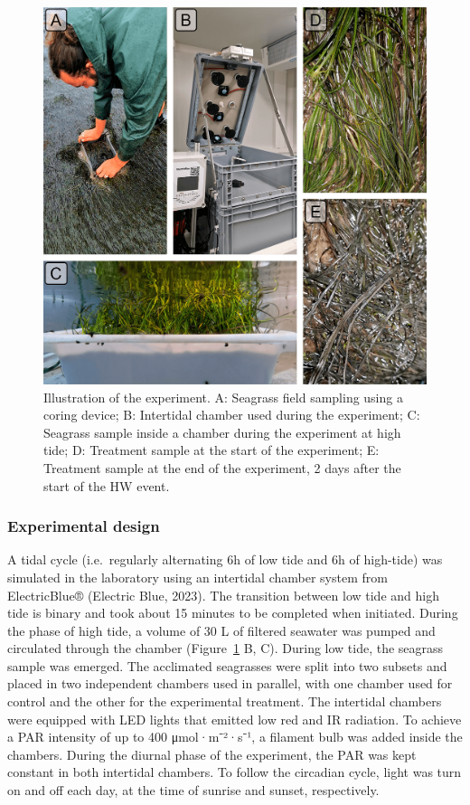 \documentclass[
  letterpaper,
  11pt,
  english,
  singlespacing,
  headsepline]{MastersDoctoralThesis}
\begin{document}
\begin{spacing}{1.5}
\begin{figure}
{\includegraphics[width=0.95\linewidth,height=\textheight,keepaspectratio]{Chapter5/Figs/Experimental_design.png}

}

\caption{\label{fig-design_h}Illustration of the experiment. A: Seagrass
field sampling using a coring device; B: Intertidal chamber used during
the experiment; C: Seagrass sample inside a chamber during the
experiment at high tide; D: Treatment sample at the start of the
experiment; E: Treatment sample at the end of the experiment, 2 days
after the start of the HW event.}

\end{figure}%

\subsubsection{Experimental design}\label{experimental-design}

A tidal cycle (i.e.~regularly alternating 6h of low tide and 6h of
high-tide) was simulated in the laboratory using an intertidal chamber
system from ElectricBlue® (Electric Blue, 2023). The transition between
low tide and high tide is binary and took about 15 minutes to be
completed when initiated. During the phase of high tide, a volume of 30
L of filtered seawater was pumped and circulated through the chamber
(Figure~\ref{fig-design_h} B, C). During low tide, the seagrass sample
was emerged. The acclimated seagrasses were split into two subsets and
placed in two independent chambers used in parallel, with one chamber
used for control and the other for the experimental treatment. The
intertidal chambers were equipped with LED lights that emitted low red
and IR radiation. To achieve a PAR intensity of up to 400 μmol·m⁻²·s⁻¹,
a filament bulb was added inside the chambers. During the diurnal phase
of the experiment, the PAR was kept constant in both intertidal
chambers. To follow the circadian cycle, light was turn on and off each
day, at the time of sunrise and sunset, respectively.


\end{spacing}
\end{document}
